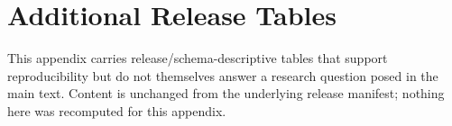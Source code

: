 \appendix
\section{Additional Release Tables}
\label{sec:appendix-release-tables}

This appendix carries release/schema-descriptive tables that support
reproducibility but do not themselves answer a research question posed in
the main text. Content is unchanged from the underlying release manifest;
nothing here was recomputed for this appendix.










